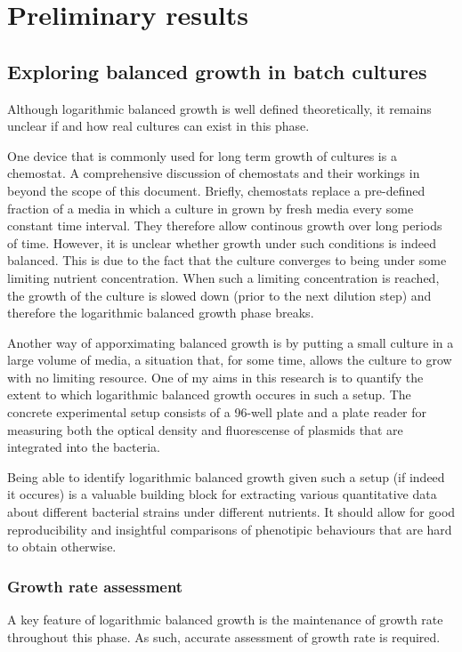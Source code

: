 \documentclass{report}
\begin{document}
\section{Preliminary results}
\subsection{Exploring balanced growth in batch cultures}
Although logarithmic balanced growth is well defined theoretically, it remains unclear if and how real cultures can exist in this phase.

One device that is commonly used for long term growth of cultures is a chemostat.
A comprehensive discussion of chemostats and their workings in beyond the scope of this document.
Briefly, chemostats replace a pre-defined fraction of a media in which a culture in grown by fresh media every some constant time interval.
They therefore allow continous growth over long periods of time.
However, it is unclear whether growth under such conditions is indeed balanced.
This is due to the fact that the culture converges to being under some limiting nutrient concentration.
When such a limiting concentration is reached, the growth of the culture is slowed down (prior to the next dilution step) and therefore the logarithmic balanced growth phase breaks.

Another way of apporximating balanced growth is by putting a small culture in a large volume of media, a situation that, for some time, allows the culture to grow with no limiting resource.
One of my aims in this research is to quantify the extent to which logarithmic balanced growth occures in such a setup.
The concrete experimental setup consists of a 96-well plate and a plate reader for measuring both the optical density and fluorescense of plasmids that are integrated into the bacteria.

Being able to identify logarithmic balanced growth given such a setup (if indeed it occures) is a valuable building block for extracting various quantitative data about different bacterial strains under different nutrients.
It should allow for good reproducibility and insightful comparisons of phenotipic behaviours that are hard to obtain otherwise.
\subsubsection{Growth rate assessment}
\label{growth-rate}
A key feature of logarithmic balanced growth is the maintenance of growth rate throughout this phase.
As such, accurate assessment of growth rate is required.
\end{document}
